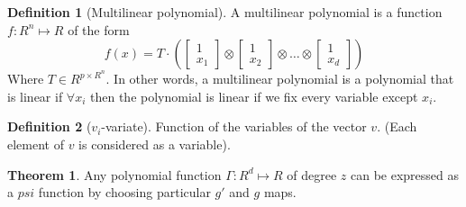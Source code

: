 \documentclass{article}
\theoremstyle{definition}
\newtheorem{definition}{Definition}[section]
\newtheorem{theorem}{Theorem}[section]
\theoremstyle{definition}
\begin{document}
\begin{definition}[Multilinear polynomial]
    A multilinear polynomial is a function $f: R^n \mapsto R$ of the form
    \begin{equation}
        f(x) = T \cdot \left( 
            \begin{bmatrix} 1 \\ x_1 \end{bmatrix} \otimes 
            \begin{bmatrix} 1 \\ x_2 \end{bmatrix} \otimes 
            \dots \otimes 
            \begin{bmatrix} 1 \\ x_d \end{bmatrix}
        \right)
    \end{equation}
    Where $T \in R^{p \times R^n }$. In other words, a multilinear polynomial is a polynomial that is linear if  $\forall x_i$ then the polynomial is linear if we fix every variable except $x_i$.
\end{definition}

\begin{definition}[$v_i$-variate]
Function of the variables of the vector $v$. (Each element of $v$ is considered as a variable).
\end{definition}


\begin{theorem}
    Any polynomial function $\Gamma: R^d \mapsto R$ of degree $z$ can be expressed as
    a $psi$ function by choosing particular $g'$ and $g$ maps.
\end{theorem}
\end{document}
